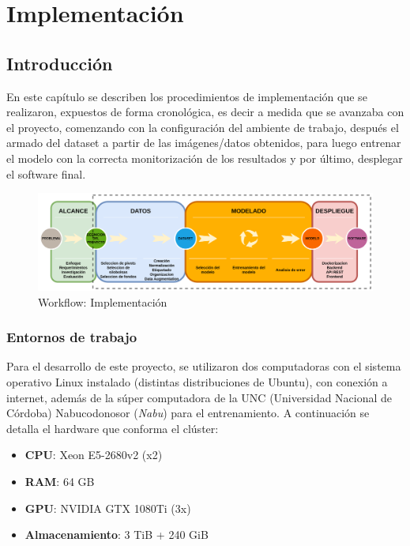 \chapter{Implementación}
\label{Implementación}

\section{Introducción}
En este capítulo se describen los procedimientos de implementación que se realizaron, expuestos de forma cronológica, es decir a medida que se avanzaba con el proyecto, comenzando con la configuración del ambiente de trabajo, después el armado del dataset a partir de las imágenes/datos obtenidos, para luego entrenar el modelo con la correcta monitorización de los resultados y por último, desplegar el software final.

\begin{figure}
    \centering
    \includegraphics[width=1.2\textwidth,center]{img/Wokflow - datos_modelado_despliegue.drawio.png}
    \caption{Workflow: Implementación}
    \label{fig:workflow - implementacion}
\end{figure}

\subsection{Entornos de trabajo}
Para el desarrollo de este proyecto, se utilizaron dos computadoras con el sistema operativo Linux instalado (distintas distribuciones de Ubuntu), con conexión a internet, además de la súper computadora de la UNC (Universidad Nacional de Córdoba) Nabucodonosor (\textit{Nabu}) \cite{nabucodonosor} para el entrenamiento. A continuación se detalla el hardware que conforma el clúster:
\begin{itemize}
    \item \textbf{CPU}: Xeon E5-2680v2 (x2)
    \item \textbf{RAM}: 64 GB
    \item \textbf{GPU}: NVIDIA GTX 1080Ti (3x)
    \item \textbf{Almacenamiento}: 3 TiB + 240 GiB
\end{itemize}

